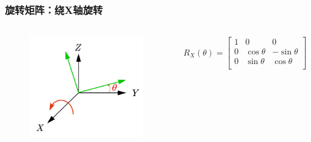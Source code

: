 \documentclass[aspectratio=43]{beamer}
\begin{document}
\begin{frame}
	\frametitle{旋转矩阵：绕X轴旋转}
	\begin{columns}
		\column{5cm}
		\begin{figure}
			\begin{center}
				\includegraphics[scale=1]{旋转矩阵X}
			\end{center}
		\end{figure}
		\column{6cm}
		\begin{gather}
			R_X\left( \theta \right) =\left[ \begin{matrix}
				1&		0&		0\\
				0&		\cos \theta&		-\sin \theta\\
				0&		\sin \theta&		\cos \theta\\
			\end{matrix} \right] 	
		\end{gather}		
	\end{columns}
\end{frame}
\end{document}
